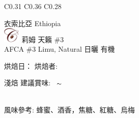 \documentclass[10pt,a4paper]{article}
\begin{document}
\begin{tabular}{C{0.31\textwidth} C{0.36\textwidth} C{0.28\textwidth}}
{{衣索比亞  %
\large
Ethiopia %
}\\
{ \hspace*{-0.66cm}\includegraphics[trim=0 20em 0 -20em,width=0.06\textwidth]{NEWC.png}%
\Large \hspace*{0.1em} \vspace*{0.15cm}  
\hspace*{0.3em}莉姆 天籟 \#3%
}\vspace*{-0.05em}\\
{\normalsize
AFCA \#3 Limu,   Natural \normalsize 日曬 有機 %
}\vspace*{0.25em}\\
\setdatetoday \addtocounter{datenumber}{
-1%
}\setdatebynumber{\thedatenumber}
{\scriptsize 烘焙日：{\scriptsize\datedate}\hspace{0.3em}%
烘焙者: \textbf{\scriptsize{}}}\vspace*{-0.3em}\\
 \addtocounter{datenumber}{
6 }%
\setdatebynumber{\thedatenumber} 
{\normalsize 
淺焙%
\enskip \scriptsize 建議賞味:} \scriptsize{\datemonthname ~\thedateday}$\thicksim$\addtocounter{datenumber}{55}\setdatebynumber{\thedatenumber} \datedate
\\\scriptsize 風味參考: 蜂蜜、酒香，焦糖、紅糖、烏梅
}
\end{tabular}
\end{document}
